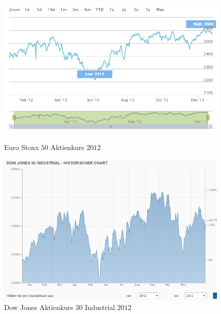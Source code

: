  \begin{figure}[H]
 \begin{minipage}[b]{.4\linewidth} %
 	\includegraphics[width=1\textwidth]{Pictures/EuroxStoxx.png}
 	\caption{Euro Stoxx $50$ Aktienkurs $2012$ \cite{stoxx}} \label{eustoxx}
 \end{minipage}
 \hspace{.1\linewidth}%
 \begin{minipage}[b]{.4\linewidth} %
 	\includegraphics[width=1\textwidth]{Pictures/DowJones2012.png}
 	\caption{Dow Jones Aktienkurs 30 Industrial $2012$ \cite{Dow}}\label{dowjones}
 \end{minipage}
\end{figure}
